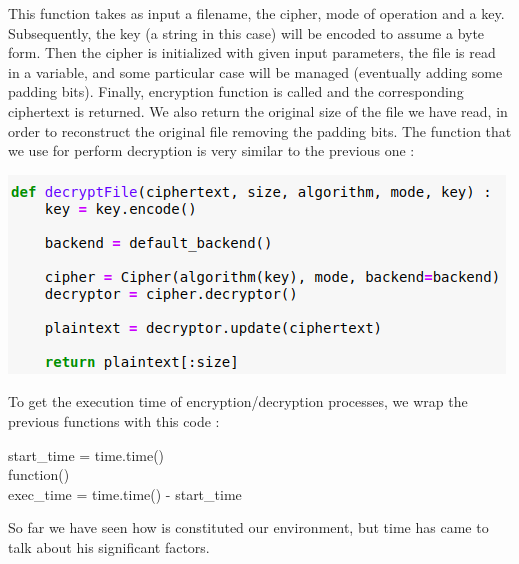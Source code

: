 \documentclass[11pt]{article}
\begin{document}
This function takes as input a filename, the cipher, mode of operation and a key. Subsequently, the key (a string in this case) will be encoded to assume a byte form. Then the cipher is initialized with given input parameters, the file is read in a variable, and some particular case will be managed (eventually adding some padding bits). Finally, encryption function is called and the corresponding ciphertext is returned. We also return the original size of the file we have read, in order to reconstruct the original file removing the padding bits. The function that we use for perform decryption is very similar to the previous one :
\begin{center}
\includegraphics[scale=0.5]{./decryption_function.png}
\end{center}
To get the execution time of encryption/decryption processes, we wrap the previous functions with this code :
\begin{center}
start\_time = time.time() \\
function() \\
exec\_time = time.time() - start\_time \\ 
\end{center}
So far we have seen how is constituted our environment, but time has came to talk about his significant factors.
\end{document}
